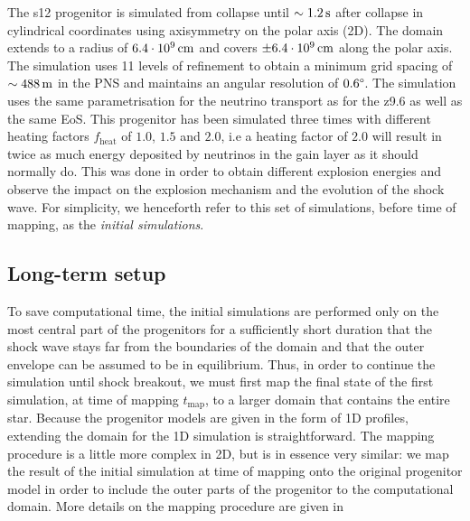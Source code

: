 The s12 progenitor is simulated from collapse until \(\sim1.2\,\mathrm{s}\) after collapse in cylindrical coordinates using axisymmetry on the polar axis (2D). The domain extends to a radius of \(6.4 \cdot 10^9\,\mathrm{cm}\) and covers \(\pm 6.4 \cdot 10^9\,\mathrm{cm}\) along the polar axis. The simulation uses 11 levels of refinement to obtain a minimum grid spacing of \(\sim488 \,\mathrm{m}\) in the PNS and maintains an angular resolution of \(0.6\degree\). The simulation uses the same parametrisation for the neutrino transport as for the z9.6 as well as the same EoS. This progenitor has been simulated three times with different heating factors \(f_\mathrm{heat}\) of \(1.0\), \(1.5\) and \(2.0\), i.e a heating factor of \(2.0\) will result in twice as much energy deposited by neutrinos in the gain layer as it should normally do. 
This was done in order to obtain different explosion energies and observe the impact on the explosion mechanism and the evolution of the shock wave.
For simplicity, we henceforth refer to this set of simulations, before time of mapping, as the \emph{initial simulations}.

\subsection{Long-term setup} \label{sec:lt_setup}

To save computational time, the initial simulations are performed only on the most central part of the progenitors for a sufficiently short duration that the shock wave stays far from the boundaries of the domain and that the outer envelope can be assumed to be in equilibrium. Thus, in order to continue the simulation until shock breakout, we must first map the final state of the first simulation, at time of mapping \(t_\mathrm{map}\), to a larger domain that contains the entire star. Because the progenitor models are given in the form of 1D profiles, extending the domain for the 1D simulation is straightforward. The mapping procedure is a little more complex in 2D, but is in essence very similar: we map the result of the initial simulation at time of mapping onto the original progenitor model in order to include the outer parts of the progenitor to the computational domain. More details on the mapping procedure are given in 

